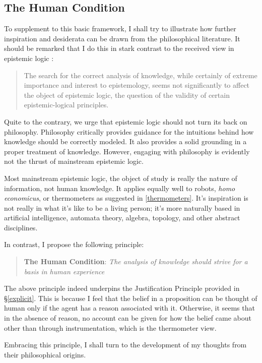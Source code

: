 \documentclass[11pt]{article}
\numberwithin{equation}{subsection}
\begin{document}
\subsection{The Human Condition}\label{Human-Condition}
To supplement to this basic framework, I shall try to illustrate how
further inspiration and desiderata can be drawn from the philosophical
literature.  It should be remarked that I do this in stark contrast to
the received view in epistemic logic
\citep[pg. 34]{lenzen_recent_1978}:
\begin{quote}
The search for the correct analysis of knowledge, while certainly of
extreme importance and interest to epistemology, seems not
significantly to affect the object of epistemic logic, the question of
the validity of certain epistemic-logical principles.
\end{quote}
Quite to the contrary, we urge that epistemic logic should not turn
its back on philosophy. Philosophy critically provides guidance for
the intuitions behind how knowledge should be correctly modeled.  It
also provides a solid grounding in a proper treatment of knowledge.
However, engaging with philosophy is evidently not the thrust of
mainstream epistemic logic.

Most mainstream epistemic logic, the object of study is really the
nature of information, not human knowledge.  It applies equally well
to robots, \emph{homo economicus}, or thermometers as suggested in
\ref{thermometers}.  It's inspiration is not really in what it's like
to be a living person; it's more naturally based in artificial intelligence, automata
theory, algebra, topology, and other abstract disciplines.

In contrast, I propose the following principle:
\begin{quote}
 \textbf{The Human Condition}: \emph{The analysis of knowledge should strive for a basis in human experience}
\end{quote}
The above principle indeed underpins the Justification Principle
provided in \S\ref{explicit}. This is because I feel that the belief
in a proposition can be thought of human only if the agent has a
reason associated with it.  Otherwise, it seems that in the absence of
reason, no account can be given for how the belief came about other
than through instrumentation, which is the thermometer view.

Embracing this principle, I shall turn to the development of my
thoughts from their philosophical origins.
\end{document}
